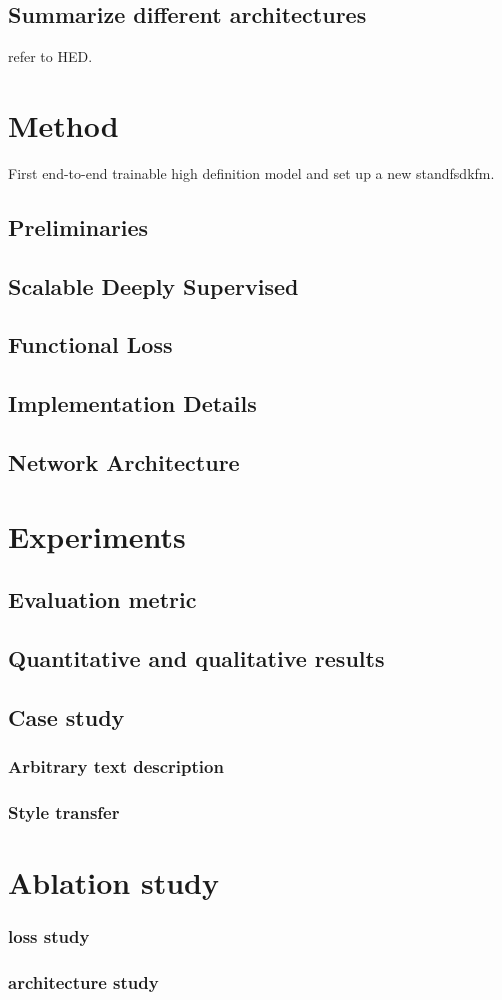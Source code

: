 \documentclass[10pt,twocolumn,letterpaper]{article}
\begin{document}
\subsection{Summarize different architectures}
refer to HED.

\section{Method}
First end-to-end trainable high definition model and set up a new standfsdkfm.

\subsection{Preliminaries}

\subsection{Scalable Deeply Supervised}

\subsection{Functional Loss}

\subsection{Implementation Details}

\subsection{Network Architecture}

\section{Experiments}
\subsection{Evaluation metric}
\subsection{Quantitative and qualitative results}

\subsection{Case study}
\subsubsection{Arbitrary text description}
\subsubsection{Style transfer}

\section{Ablation study}
\subsubsection{loss study}
\subsubsection{architecture study}



{\small


}
\end{document}
